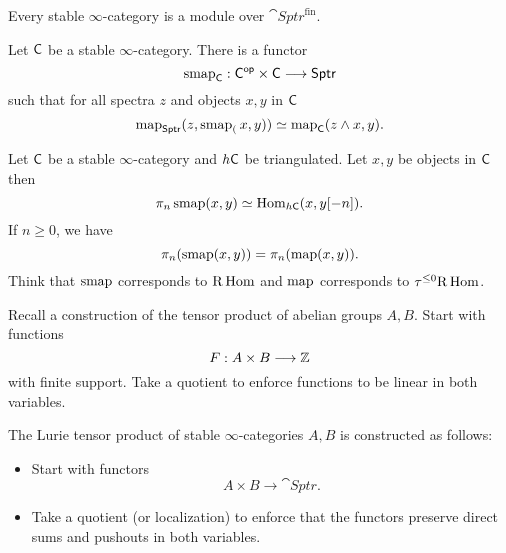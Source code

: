 \begin{theorem}
	Every stable $\infty$-category is a module over $\cat{Sptr}^{\text{fin}}$.
\end{theorem}
\begin{theorem}[Lurie]
	Let $\mathsf{C}$ be a stable $\infty$-category. There is a functor
	\[
		\smap_\C : \C\op\times \C\to \cat{Sptr}
	\] 
	such that for all spectra $z$ and objects $x,y$ in $\mathsf{C}$ 
	\[
		\operatorname{map}_{\mathsf{Sptr}}(z,\operatorname{smap}_(x,y)) \simeq \operatorname{map}_\mathsf{C}(z\wedge x, y).
	\] 
\end{theorem}
Let $\mathsf{C}$ be a stable $\infty$-category and $h\mathsf{C}$ be triangulated. Let $x,y$ be objects in $\mathsf{C}$ then
\[
	\pi_n\operatorname{smap}(x,y) \simeq \operatorname{Hom}_{h\mathsf{C}}(x,y[-n]).
\] 
If $n\ge 0$, we have
\[
\pi_n(\operatorname{smap}(x,y)) = \pi_n(\operatorname{map}(x,y)).
\] 
Think that $\operatorname{smap} $ corresponds to $\mathrm{R}\operatorname{Hom}$ and $\operatorname{map}$ corresponds to $\tau^{\le 0}\mathrm{R}\operatorname{Hom}$.

Recall a construction of the tensor product of abelian groups $A,B$. Start with functions 
\[
F:A\times B\to \Z
\] 
with finite support. Take a quotient to enforce functions to be linear in both variables.

The Lurie tensor product of stable $\infty$-categories $A,B$ is constructed as follows:
\begin{itemize}
	\item Start with functors
		\[
			A\times B\to \cat{Sptr}.
		\] 
	\item Take a quotient (or localization) to enforce that the functors preserve direct sums and pushouts in both variables.
\end{itemize}



